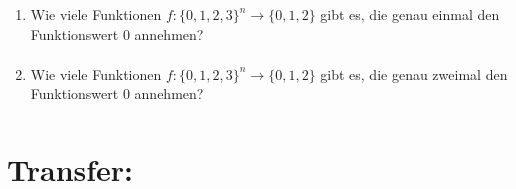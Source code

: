 \begin{enumerate}[label=(\alph*)]
		\item Wie viele Funktionen $f : \{0, 1, 2, 3\}^n \to \{0, 1, 2\}$ gibt es, die genau einmal den Funktionswert 0 annehmen?
		\begin{align*}
		\end{align*}

		\item Wie viele Funktionen $f : \{0, 1, 2, 3\}^n \to \{0, 1, 2\}$ gibt es, die genau zweimal den Funktionswert 0 annehmen?
		\begin{align*}
		\end{align*}
		
	\end{enumerate} 
	
	\section*{Transfer:}
